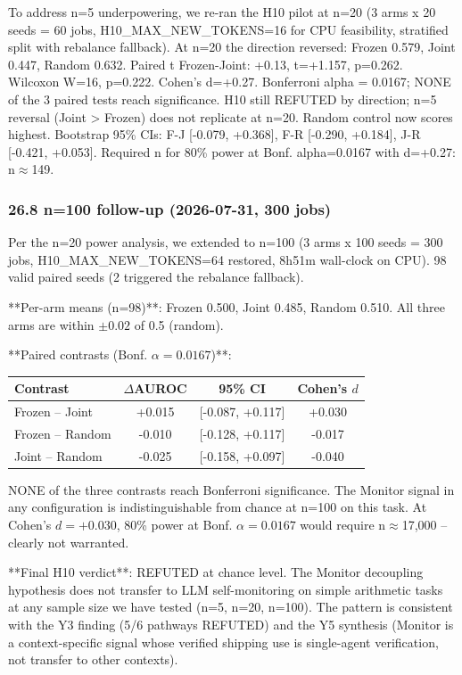 \documentclass[11pt]{article}
\begin{document}
To address n=5 underpowering, we re-ran the H10 pilot at n=20
(3 arms x 20 seeds = 60 jobs, H10\_MAX\_NEW\_TOKENS=16 for CPU
feasibility, stratified split with rebalance fallback). At
n=20 the direction reversed: Frozen 0.579, Joint 0.447, Random
0.632. Paired t Frozen-Joint: +0.13, t=+1.157, p=0.262. Wilcoxon
W=16, p=0.222. Cohen's d=+0.27. Bonferroni alpha = 0.0167;
NONE of the 3 paired tests reach significance. H10 still
REFUTED by direction; n=5 reversal (Joint > Frozen) does not
replicate at n=20. Random control now scores highest. Bootstrap
95\% CIs: F-J [-0.079, +0.368], F-R [-0.290, +0.184], J-R [-0.421,
+0.053]. Required n for 80\% power at Bonf. alpha=0.0167 with
d=+0.27: n$\approx$149.

\subsubsection{26.8 n=100 follow-up (2026-07-31, 300 jobs)}

Per the n=20 power analysis, we extended to n=100 (3 arms x 100
seeds = 300 jobs, H10\_MAX\_NEW\_TOKENS=64 restored, 8h51m
wall-clock on CPU). 98 valid paired seeds (2 triggered the
rebalance fallback).

**Per-arm means (n=98)**: Frozen 0.500, Joint 0.485, Random
0.510. All three arms are within $\pm 0.02$ of 0.5 (random).

**Paired contrasts (Bonf. $\alpha=0.0167$)**:

\begin{tabular}{lccc}
\toprule
Contrast & $\Delta$AUROC & 95\% CI & Cohen's $d$ \\
\midrule
Frozen -- Joint & +0.015 & [-0.087, +0.117] & +0.030 \\
Frozen -- Random & -0.010 & [-0.128, +0.117] & -0.017 \\
Joint -- Random & -0.025 & [-0.158, +0.097] & -0.040 \\
\bottomrule
\end{tabular}

NONE of the three contrasts reach Bonferroni significance. The
Monitor signal in any configuration is indistinguishable from
chance at n=100 on this task. At Cohen's $d=+0.030$, 80\% power
at Bonf. $\alpha=0.0167$ would require n$\approx$17,000 --
clearly not warranted.

**Final H10 verdict**: REFUTED at chance level. The Monitor
decoupling hypothesis does not transfer to LLM self-monitoring
on simple arithmetic tasks at any sample size we have tested
(n=5, n=20, n=100). The pattern is consistent with the Y3
finding (5/6 pathways REFUTED) and the Y5 synthesis (Monitor
is a context-specific signal whose verified shipping use is
single-agent verification, not transfer to other contexts).
\end{document}
